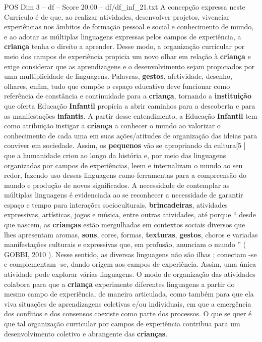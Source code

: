 \begin{textsample}{POS Dim 3 – df – Score 20.00 – df/df\_inf\_21.txt}
A concepção expressa neste Currículo é de que, ao realizar atividades, desenvolver projetos, vivenciar experiências nos âmbitos de formação pessoal e social e conhecimento de mundo, e ao adotar as múltiplas linguagens expressas pelos campos de experiência, a \textbf{criança} tenha o direito a aprender.
Desse modo, a organização curricular por meio dos campos de experiência propicia um novo olhar em relação à \textbf{criança} e exige considerar que as aprendizagens e o desenvolvimento sejam propiciados por uma multiplicidade de linguagens.
Palavras, \textbf{gestos}, afetividade, desenho, olhares, enfim, tudo que compõe o espaço educativo deve funcionar como referência de constância e continuidade para a \textbf{criança}, tornando a \textbf{instituição} que oferta Educação \textbf{Infantil} propícia a abrir caminhos para a descoberta e para as manifestações \textbf{infantis}.
A partir desse entendimento, a Educação \textbf{Infantil} tem como atribuição instigar a \textbf{criança} a conhecer o mundo ao valorizar o conhecimento de cada uma em suas ações/atitudes de organização das ideias para conviver em sociedade.
Assim, os \textbf{pequenos} vão se apropriando da cultura[5 ] que a humanidade criou ao longo da história e, por meio das linguagens organizadas por campos de experiências, leem e internalizam o mundo ao seu redor, fazendo uso dessas linguagens como ferramentas para a compreensão do mundo e produção de novos significados.
A necessidade de contemplar as múltiplas linguagens é evidenciada ao se reconhecer a necessidade de garantir espaço e tempo para interações socioculturais, \textbf{brincadeiras}, atividades expressivas, artísticas, jogos e música, entre outras atividades, até porque “ desde que nascem, as \textbf{crianças} estão mergulhadas em contextos sociais diversos que lhes apresentam aromas, \textbf{sons}, cores, formas, \textbf{texturas}, \textbf{gestos}, choros e variadas manifestações culturais e expressivas que, em profusão, anunciam o mundo ” ( GOBBI, 2010 ).
Nesse sentido, as diversas linguagens não são ilhas ; conectam -se e complementam -se, dando origem aos campos de experiência.
Assim, uma única atividade pode explorar várias linguagens.
O modo de organização das atividades colabora para que a \textbf{criança} experimente diferentes linguagens a partir do mesmo campo de experiência, de maneira articulada, como também para que ela viva situações de aprendizagens coletivas e/ou individuais, em que a emergência dos conflitos e dos consensos coexiste como parte dos processos.
O que se quer é que tal organização curricular por campos de experiência contribua para um desenvolvimento coletivo e abrangente das \textbf{crianças}.

\end{textsample}
